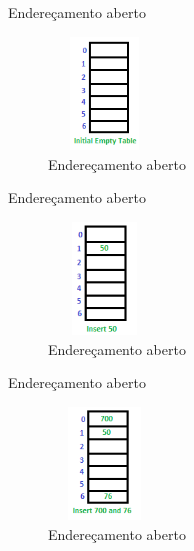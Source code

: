 \begin{frame}
	\begin{block}{Endereçamento aberto}
		\begin{figure}[!htb]
			\centering	  				
			\includegraphics[height=3cm, width = 3cm]{./pic/openAddressing11Linear.png}
			\caption{Endereçamento aberto  \cite{GEEKS_2018}}
		\end{figure}
	\end{block}
\end{frame}

\begin{frame}
	\begin{block}{Endereçamento aberto}
		\begin{figure}[!htb]
			\centering	  				
			\includegraphics[height=3cm, width = 3cm]{./pic/openAddressing12Linear.png}
			\caption{Endereçamento aberto  \cite{GEEKS_2018}}
		\end{figure}
	\end{block}
\end{frame}

\begin{frame}
	\begin{block}{Endereçamento aberto}
		\begin{figure}[!htb]
			\centering	  				
			\includegraphics[height=3cm, width = 3cm]{./pic/openAddressing13Linear.png}
			\caption{Endereçamento aberto  \cite{GEEKS_2018}}
		\end{figure}
	\end{block}
\end{frame}

